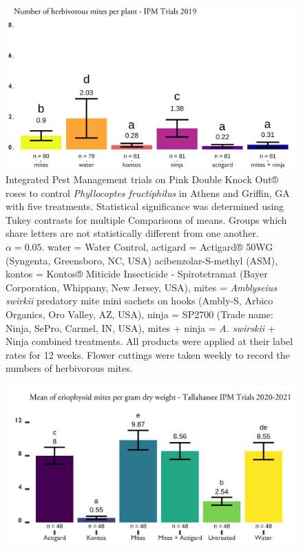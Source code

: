 \documentclass[12pt,final,CPage]{ufthesis}
\begin{document}
{\begin{figure}
  {\centering \includegraphics[width=0.8\linewidth]{figure/ipm_graph} 

  }

  \caption{Integrated Pest Management trials on Pink Double Knock Out® roses to control \textit{Phyllocoptes fructiphilus} in Athens and Griffin, GA with five treatments. Statistical significance was determined using Tukey contrasts for multiple Comparisons of means. Groups which share letters are not statistically different from one another. $\alpha = 0.05$. water = Water Control, actigard = Actigard® 50WG (Syngenta, Greensboro, NC, USA) acibenzolar-S-methyl (ASM), kontos = Kontos® Miticide Insecticide - Spirotetramat (Bayer Corporation, Whippany, New Jersey, USA), mites = \textit{Amblyseius swirkii} predatory mite mini sachets on hooks (Ambly-S, Arbico Organics, Oro Valley, AZ, USA), ninja = SP2700 (Trade name: Ninja\texttrademark, SePro, Carmel, IN, USA), mites + ninja = \textit{A. swirskii} + Ninja combined treatments. All products were applied at their label rates for 12 weeks. Flower cuttings were taken weekly to record the numbers of herbivorous mites.}\label{fig:ipm}
  \end{figure}
  \begin{figure}

  {\centering \includegraphics[width=0.8\linewidth]{figure/rrv_ipm_graph_erios_talla} 

}
\end{figure}}
\end{document}
